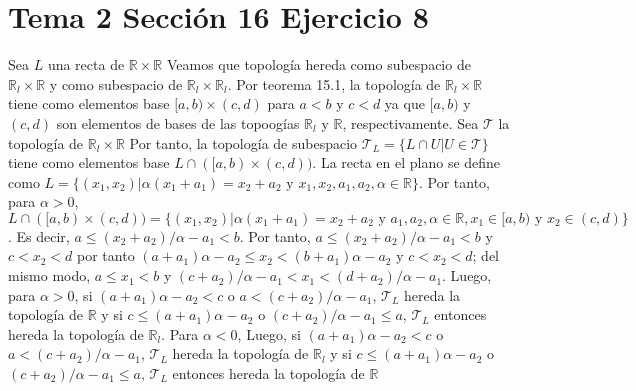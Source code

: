 \documentclass{article}
\begin{document}
\section{Tema 2 Sección 16 Ejercicio 8}
Sea $L$ una recta de $\mathbb{R}\times \mathbb{R}$ Veamos que topología hereda como subespacio de $\mathbb{R}_l\times \mathbb{R}$ y como subespacio de $\mathbb{R}_l\times \mathbb{R}_l$. 
Por teorema 15.1, la topología de $\mathbb{R}_l\times \mathbb{R}$ tiene como elementos base $[a,b)\times (c,d)$ para $a<b$ y $c<d$ ya que $[a,b)$ y $(c,d)$ son elementos de bases de las topoogías $\mathbb{R}_l$ y $\mathbb{R}$, respectivamente. Sea $\mathcal{T}$ la topología de $\mathbb{R}_l\times \mathbb{R}$ Por tanto, la topología de subespacio $\mathcal{T}_L=\{L\cap U| U\in \mathcal{T}\}$ tiene como elementos base $L\cap([a,b)\times(c,d))$. La recta en el plano se define como $L=\{(x_1,x_2)| \alpha (x_1+a_1)= x_2+a_2\text{ y }x_1,x_2,a_1,a_2,\alpha\in \mathbb{R}\}$. Por tanto, para $\alpha>0$, $L\cap([a,b)\times(c,d))=\{(x_1,x_2)|  \alpha (x_1+a_1)= x_2+a_2\text{ y }a_1,a_2,\alpha\in \mathbb{R},x_1\in [a,b)\text{ y }x_2\in (c,d)\}$. Es decir, $a\leq (x_2+a_2)/\alpha-a_1<b$. Por tanto,  $a\leq (x_2+a_2)/\alpha-a_1<b$ y $c<x_2<d$ por tanto  $(a+a_1)\alpha -a_2\leq x_2<(b+a_1)\alpha-a_2$ y $c<x_2<d$; del mismo modo, $a\leq x_1<b$ y $(c+a_2)/\alpha-a_1<x_1<(d+a_2)/\alpha-a_1$. Luego, para $\alpha>0$, si $(a+a_1)\alpha -a_2< c$ o $a<(c+a_2)/\alpha-a_1$,  $\mathcal{T}_L$ hereda la topología de $\mathbb{R}$ y si $c\leq (a+a_1)\alpha -a_2$ o $(c+a_2)/\alpha-a_1\leq a$,  $\mathcal{T}_L$ entonces hereda la topología de $\mathbb{R}_l$. Para $\alpha<0$, Luego, si $(a+a_1)\alpha -a_2< c$ o $a<(c+a_2)/\alpha-a_1$,  $\mathcal{T}_L$ hereda la topología de $\mathbb{R}_l$ y si $c\leq (a+a_1)\alpha -a_2$ o $(c+a_2)/\alpha-a_1\leq a$,  $\mathcal{T}_L$ entonces hereda la topología de $\mathbb{R}$
\end{document}
